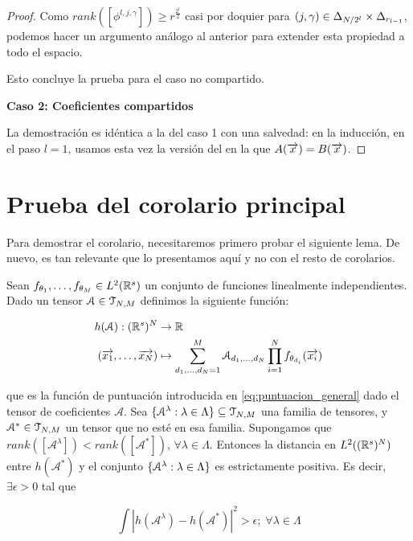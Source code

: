 \begin{proof}
    Como $rank([\phi^{l, j, \gamma}]) \geq r^{\frac{2^l}{2}}$ casi por doquier para $(j, \gamma) \in \Delta_{N/2^l} \times \Delta_{r_{l-1}}$, podemos hacer un argumento análogo al anterior para extender esta propiedad a todo el espacio.

    Esto concluye la prueba para el caso no compartido.

    \textbf{Caso 2: Coeficientes compartidos}

    La demostración es idéntica a la del caso 1 con una salvedad: en la inducción, en el paso $l = 1$, usamos esta vez la versión del  en la que $A(\overrightarrow{x}) = B(\overrightarrow{x})$.
\end{proof}

\section{Prueba del corolario principal}

Para demostrar el corolario, necesitaremos primero probar el siguiente lema. De nuevo, es tan relevante que lo presentamos aquí y no con el resto de corolarios.

\begin{lema} \label{lema:lema_previo_corolario}
    Sean $f_{\theta_1}, \ldots, f_{\theta_M} \in L^2(\mathbb{R}^s)$ un conjunto de funciones linealmente independientes. Dado un tensor $\mathcal{A} \in \mathcal{T}_{N, M}$ definimos la siguiente función:

    \begin{equation}
    \begin{split}
        h(\mathcal{A}): (\mathbb{R}^s)^N &\to \mathbb{R} \\
        (\overrightarrow{x_1}, \ldots, \overrightarrow{x_N}) &\mapsto \sum_{d_1, \ldots, d_N = 1}^M \mathcal{A}_{d_1, \ldots, d_N} \prod_{i = 1}^N f_{\theta_{d_i}}(\overrightarrow{x_i})
    \end{split}
    \end{equation}

    que es la función de puntuación introducida en \eqref{eq:puntuacion_general} dado el tensor de coeficientes $\mathcal{A}$. Sea $\{ \mathcal{A}^\lambda: \lambda \in \Lambda \} \subseteq \mathcal{T}_{N, M}$ una familia de tensores, y $\mathcal{A}^* \in \mathcal{T}_{N, M}$ un tensor que no esté en esa familia. Supongamos que $rank([\mathcal{A}^\lambda]) < rank([\mathcal{A}^*])$, $\forall \lambda \in \Lambda$. Entonces la distancia en $L^2((\mathbb{R}^s)^N)$ entre $h(\mathcal{A}^*)$ y el conjunto $\{ \mathcal{A}^\lambda: \lambda \in \Lambda \}$ es estrictamente positiva. Es decir, $\exists \epsilon > 0$ tal que

    \begin{equation}
        \int |h(\mathcal{A}^\lambda) - h(\mathcal{A}^*)|^2 > \epsilon; \; \forall \lambda \in \Lambda
    \end{equation}
\end{lema}

